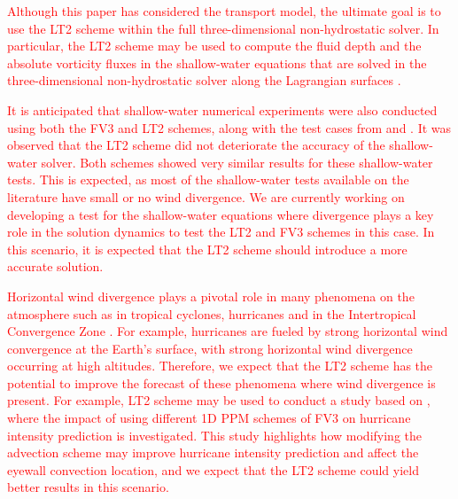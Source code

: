 \documentclass[preprint,12pt]{elsarticle}
\begin{document}
\begin{linenumbers}



\textcolor{red}{
Although this paper has considered the transport model, the ultimate goal is to use the LT2 scheme within the full three-dimensional non-hydrostatic solver. 
In particular, the LT2 scheme may be used to compute the fluid depth and the absolute vorticity fluxes in the shallow-water equations that are solved in the three-dimensional non-hydrostatic solver along the Lagrangian surfaces \cite{lin:2004}.}

\textcolor{red}{
It is anticipated that shallow-water numerical experiments were also conducted using both the FV3 and LT2 schemes, along with the test cases from \cite{will:1992} and \cite{galewsky:2004}. It was observed that the LT2 scheme did not deteriorate the accuracy of the shallow-water solver. 
Both schemes showed very similar results for these shallow-water tests.
This is expected, as most of the shallow-water tests available on the literature have small or no wind divergence.
We are currently working on developing a test for the shallow-water equations where divergence plays a key role in the solution dynamics to test the LT2 and FV3 schemes in this case.
In this scenario, it is expected that the LT2 scheme should introduce a more accurate solution.}

\textcolor{red}{
Horizontal wind divergence plays a pivotal role in many phenomena on the atmosphere such as in tropical cyclones, hurricanes and in the Intertropical Convergence Zone \cite{holton:2012}.
For example, hurricanes are fueled by strong horizontal wind convergence at the Earth’s surface, with strong horizontal wind divergence occurring at high altitudes.
Therefore, we expect that the LT2 scheme has the potential to improve the forecast of these phenomena where wind divergence is present.
For example, LT2 scheme may be used to conduct a study based on \cite{gao:2021}, where the impact of using different 1D PPM schemes of FV3 on hurricane intensity prediction is investigated. 
This study highlights how modifying the advection scheme may improve hurricane intensity prediction and affect the eyewall convection location, and we expect that the LT2 scheme could yield better results in this scenario.
}



\end{linenumbers}
\end{document}
